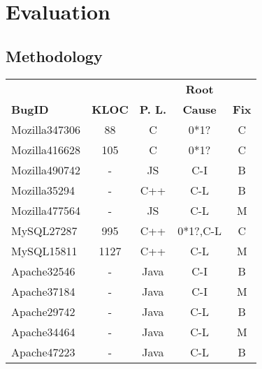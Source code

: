 \section{Evaluation}
\label{sec:experiment}

\subsection{Methodology}
\label{sec:result_meth}


\begin{table}
  \centering
  \small
  \newcommand{\Yes}[1]{\checkmark{}$_#1$}
  \newcommand{\No}[0]{-}
  \begin{tabular}{lcccc}
    \toprule
                         &      	   &                        & {\bf Root}   &          \\
   {\bf BugID}           &  {\bf KLOC}     &  {\bf P. L.}           & {\bf Cause}  & {\bf Fix}\\
   \midrule
   Mozilla347306         & 88              & C                      &  0*1?        & C     \\
   Mozilla416628         & 105             & C                      &  0*1?        & C     \\
   Mozilla490742         &  -             & JS                     &  C-I         & B       \\
   Mozilla35294          &  -             & C++                    &  C-L         & B        \\ 
   Mozilla477564         &  -             & JS                     &  C-L         & M       \\
   \midrule 
   MySQL27287            & 995             & C++                    &  0*1?,C-L        & C     \\
   MySQL15811            & 1127            & C++                    &  C-L         & M \\ 
   \midrule    
   Apache32546           &  -             & Java                   &  C-I         & B  \\
   Apache37184           &  -             & Java                   &  C-I         & M  \\
   Apache29742           &  -             & Java                   &  C-L         & B \\ 
   Apache34464           &  -             & Java                   &  C-L         & M  \\
   Apache47223           &  -             & Java                   &  C-L         & B \\

\end{tabular}
\end{table}
